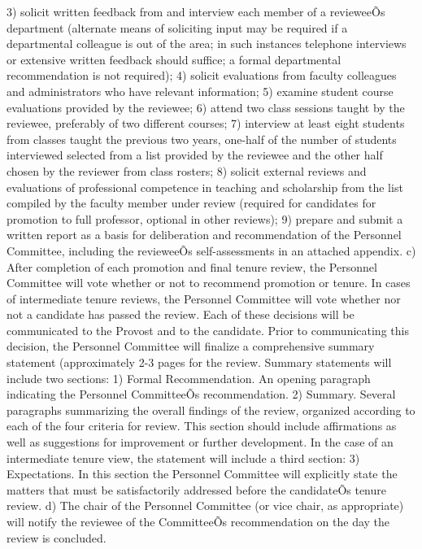 \documentclass[letterpaper, 11pt]{article}
\begin{document}
				3) solicit written feedback from and interview each member of a revieweeÕs department (alternate means of soliciting input may be required if a departmental colleague is out of the area; in such instances telephone interviews or extensive written feedback should suffice; a formal departmental recommendation is not required);
				4) solicit evaluations from faculty colleagues and administrators who have relevant information;
				5) examine student course evaluations provided by the reviewee;
				6) attend two class sessions taught by the reviewee, preferably of two different courses;
				7) interview at least eight students from classes taught the previous two years, one-half of the number of students interviewed selected from a list provided by the reviewee and the other half chosen by the reviewer from class rosters;
				8) solicit external reviews and evaluations of professional competence in teaching and scholarship from the list compiled by the faculty member under review (required for candidates for promotion to full professor, optional in other reviews);
				9) prepare and submit a written report as a basis for deliberation and recommendation of the Personnel Committee, including the revieweeÕs self-assessments in an attached appendix.
				c) After completion of each promotion and final tenure review, the Personnel Committee will vote whether or not to recommend promotion or tenure.  In cases of intermediate tenure reviews, the Personnel Committee will vote whether nor not a candidate has passed the review.  Each of these decisions will be communicated to the Provost and to the candidate.  Prior to communicating this decision, the Personnel Committee will finalize a comprehensive summary statement (approximately 2-3 pages for the review.  Summary statements will include two sections:
				1) Formal Recommendation.  An opening paragraph indicating the Personnel CommitteeÕs recommendation.
				2) Summary.  Several paragraphs summarizing the overall findings of the review, organized according to each of the four criteria for review.  This section should include affirmations as well as suggestions for improvement or further development.
				In the case of an intermediate tenure view, the statement will include a third section:
				3) Expectations.  In this section the Personnel Committee will explicitly state the matters that must be satisfactorily addressed before the candidateÕs tenure review.
				d)   The chair of the Personnel Committee (or vice chair, as appropriate) will notify the reviewee of the CommitteeÕs recommendation on the day the review is concluded.
\end{document}
